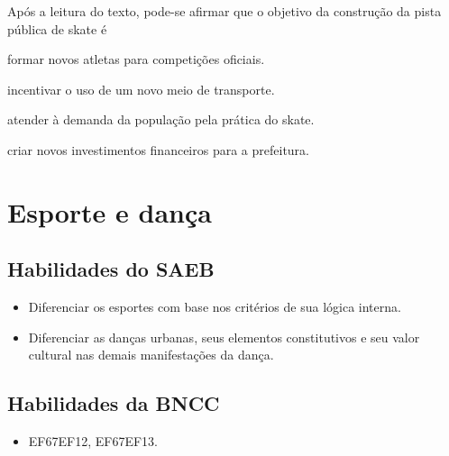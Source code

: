 Após a leitura do texto, pode-se afirmar que o objetivo da construção da 
pista pública de skate é

\begin{escolha}
\item formar novos atletas para competições oficiais.

\item incentivar o uso de um novo meio de transporte.

\item atender à demanda da população pela prática do skate.

\item criar novos investimentos financeiros para a prefeitura.
\end{escolha}

\chapter{Esporte e dança}


\section*{Habilidades do SAEB}

\begin{itemize}
\item
  Diferenciar os esportes com base nos critérios de sua lógica interna.
\item
  Diferenciar as danças urbanas, seus elementos constitutivos e seu
  valor cultural nas demais manifestações da dança.
\end{itemize}

\section*{Habilidades da BNCC}

\begin{itemize}
\item EF67EF12, EF67EF13.
\end{itemize}


